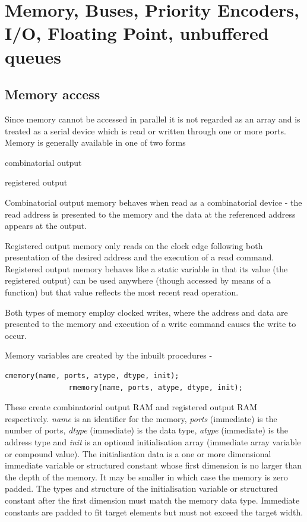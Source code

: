 \pagebreak

\chapter{Memory, Buses, Priority Encoders, I/O, Floating Point, unbuffered queues}

    \section{Memory access}

        Since memory cannot be accessed in parallel it is not regarded as an
        array and is treated as a serial device which is read or written
        through one or more ports. Memory is generally available in one of
        two forms
        \blist
        \item   combinatorial output
        \item   registered output
        \blend

        Combinatorial output memory behaves when read as a combinatorial
        device - the read address is presented to the memory and the
        data at the referenced address appears at the output.

        Registered output memory only reads on the clock edge following both
        presentation of the desired address and the execution of a read
        command. Registered output memory behaves like a static variable in
        that its value (the registered output) can be used anywhere (though
        accessed by means of a function) but that value reflects the most
        recent read operation.

        Both types of memory employ clocked writes, where the address and data are
        presented to the memory and execution of a write command causes the write
        to occur.

        Memory variables are created by the inbuilt procedures -
        \begin{lstlisting}[gobble=8, language=threepl]
               cmemory(name, ports, atype, dtype, init);
               rmemory(name, ports, atype, dtype, init);
        \end{lstlisting}
        These create combinatorial output RAM and registered output RAM
        respectively. {\em name} is an identifier for the memory, {\em ports}
        (immediate) is the number of ports, {\em dtype} (immediate) is the data
        type, {\em atype} (immediate) is the address type and {\em init} is an
        optional initialisation array (immediate array variable or compound
        value). The initialisation data is a one or more dimensional
        immediate variable or structured constant whose first dimension is no
        larger than the depth of the memory. It may be smaller in which case the
        memory is zero padded. The types and structure of the initialisation
        variable or structured constant after the first dimension must match
        the memory data type. Immediate constants are padded to fit target
        elements but must not exceed the target width.

